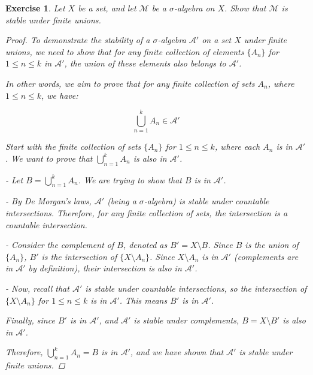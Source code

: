 \documentclass{article}
\newtheorem{exercise}{Exercise}
\begin{document}
    \begin{exercise}
        Let $X$ be a set, and let $\mathcal{M}$ be a $\sigma$-algebra on $X$. Show that $\mathcal{M}$ is stable under finite unions.
    \begin{proof}
        To demonstrate the stability of a $\sigma$-algebra $\mathcal{A}'$ on a set $X$ under finite unions, we need to show that for any finite collection of elements $\{A_n\}$ for $1 \leq n \leq k$ in $\mathcal{A}'$, the union of these elements also belongs to $\mathcal{A}'$.

    In other words, we aim to prove that for any finite collection of sets $A_n$, where $1 \leq n \leq k$, we have:

\[
\bigcup_{n=1}^{k} A_n \in \mathcal{A}'
\]

    Start with the finite collection of sets $\{A_n\}$ for $1 \leq n \leq k$, where each $A_n$ is in $\mathcal{A}'$. We want to prove that $\bigcup_{n=1}^{k} A_n$ is also in $\mathcal{A}'$.

- Let $B = \bigcup_{n=1}^{k} A_n$. We are trying to show that $B$ is in $\mathcal{A}'$.

- By De Morgan's laws, $\mathcal{A}'$ (being a $\sigma$-algebra) is stable under countable intersections. Therefore, for any finite collection of sets, the intersection is a countable intersection.

- Consider the complement of $B$, denoted as $B' = X \setminus B$. Since $B$ is the union of $\{A_n\}$, $B'$ is the intersection of $\{X \setminus A_n\}$. Since $X \setminus A_n$ is in $\mathcal{A}'$ (complements are in $\mathcal{A}'$ by definition), their intersection is also in $\mathcal{A}'$.

- Now, recall that $\mathcal{A}'$ is stable under countable intersections, so the intersection of $\{X \setminus A_n\}$ for $1 \leq n \leq k$ is in $\mathcal{A}'$. This means $B'$ is in $\mathcal{A}'$.

Finally, since $B'$ is in $\mathcal{A}'$, and $\mathcal{A}'$ is stable under complements, $B = X \setminus B'$ is also in $\mathcal{A}'$.

Therefore, $\bigcup_{n=1}^{k} A_n = B$ is in $\mathcal{A}'$, and we have shown that $\mathcal{A}'$ is stable under finite unions.

\end{proof}
\end{exercise}
\end{document}
